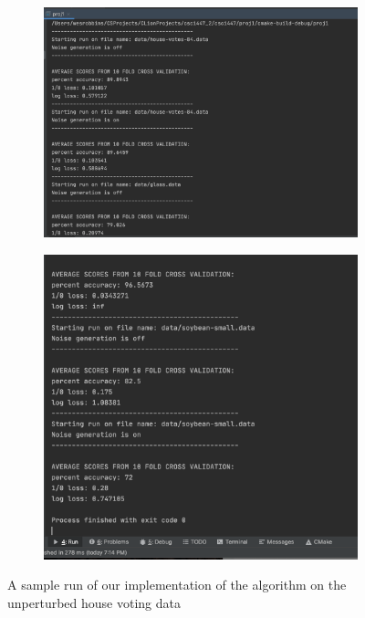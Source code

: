 \documentclass[twoside,11pt]{article}
\begin{document}
\begin{figure}[h!]
  \centering  
   \begin{subfigure}[b]{0.6\linewidth}
    \includegraphics[width=\linewidth]{images/sample1.png}
  \end{subfigure}
  \begin{subfigure}[b]{0.6\linewidth}
    \includegraphics[width=\linewidth]{images/sample2.png}
  \end{subfigure}
  \caption{A sample run of our implementation of the algorithm on the unperturbed house voting data}
  \label{fig:good}
\end{figure}
\end{document}
